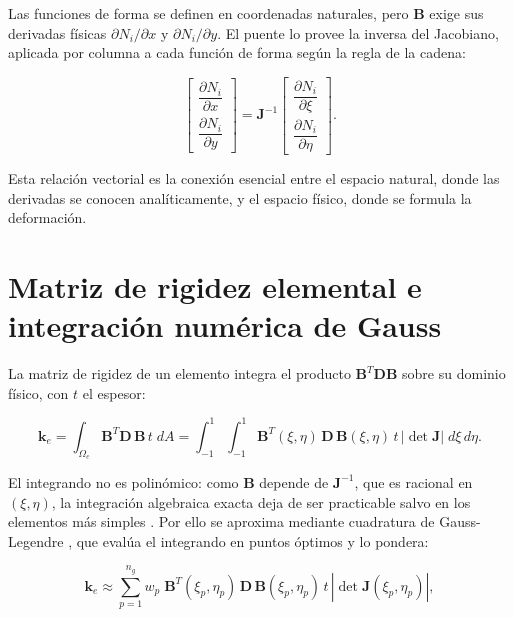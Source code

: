 Las funciones de forma se definen en coordenadas naturales, pero $\bm{B}$ exige sus derivadas físicas $\partial N_i/\partial x$ y $\partial N_i/\partial y$. El puente lo provee la inversa del Jacobiano, aplicada por columna a cada función de forma según la regla de la cadena:

\begin{equation}
\begin{bmatrix}
\dfrac{\partial N_i}{\partial x} \\[6pt]
\dfrac{\partial N_i}{\partial y}
\end{bmatrix}
= \bm{J}^{-1}
\begin{bmatrix}
\dfrac{\partial N_i}{\partial \xi} \\[6pt]
\dfrac{\partial N_i}{\partial \eta}
\end{bmatrix}.
\label{eq:fisica-natural}
\end{equation}

Esta relación vectorial es la conexión esencial entre el espacio natural, donde las derivadas se conocen analíticamente, y el espacio físico, donde se formula la deformación.

\section{Matriz de rigidez elemental e integración numérica de Gauss}
\label{sec:rigidez-gauss}

La matriz de rigidez de un elemento integra el producto $\bm{B}^T\bm{D}\bm{B}$ sobre su dominio físico, con $t$ el espesor:

\begin{equation}
\bm{k}_e = \int_{\Omega_e} \bm{B}^T \bm{D}\, \bm{B}\, t \; dA
= \int_{-1}^{1}\!\!\int_{-1}^{1} \bm{B}^T(\xi,\eta)\,\bm{D}\,\bm{B}(\xi,\eta)\, t\, |\det\bm{J}|\; d\xi\, d\eta.
\label{eq:ke-integral}
\end{equation}

El integrando no es polinómico: como $\bm{B}$ depende de $\bm{J}^{-1}$, que es racional en $(\xi,\eta)$, la integración algebraica exacta deja de ser practicable salvo en los elementos más simples \autocite{zienkiewicz2013fem}. Por ello se aproxima mediante cuadratura de Gauss-Legendre \autocite{hughes2000fem}, que evalúa el integrando en puntos óptimos y lo pondera:

\begin{equation}
\bm{k}_e \approx \sum_{p=1}^{n_g} w_p\; \bm{B}^T(\xi_p,\eta_p)\,\bm{D}\,\bm{B}(\xi_p,\eta_p)\, t\, |\det\bm{J}(\xi_p,\eta_p)|,
\label{eq:ke-gauss}
\end{equation}

